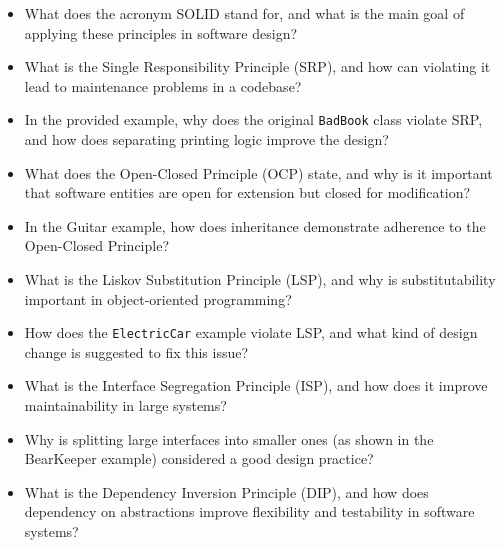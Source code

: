 \begin{itemize}
    \item What does the acronym SOLID stand for, and what is the main goal of applying these principles in software design?

    \item What is the Single Responsibility Principle (SRP), and how can violating it lead to maintenance problems in a codebase?

    \item In the provided example, why does the original \texttt{BadBook} class violate SRP, and how does separating printing logic improve the design?

    \item What does the Open-Closed Principle (OCP) state, and why is it important that software entities are open for extension but closed for modification?

    \item In the Guitar example, how does inheritance demonstrate adherence to the Open-Closed Principle?

    \item What is the Liskov Substitution Principle (LSP), and why is substitutability important in object-oriented programming?

    \item How does the \texttt{ElectricCar} example violate LSP, and what kind of design change is suggested to fix this issue?

    \item What is the Interface Segregation Principle (ISP), and how does it improve maintainability in large systems?

    \item Why is splitting large interfaces into smaller ones (as shown in the BearKeeper example) considered a good design practice?

    \item What is the Dependency Inversion Principle (DIP), and how does dependency on abstractions improve flexibility and testability in software systems?
\end{itemize}


